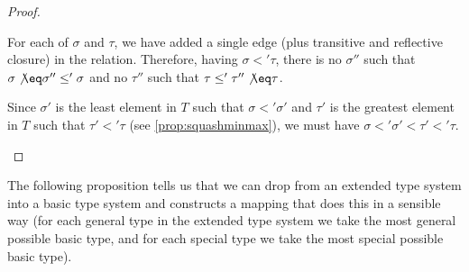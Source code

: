 \documentclass[main.tex]{subfiles}
\begin{document}
\begin{proof}
\begin{itemize}
\begin{itemize}
                    For each of $\sigma$ and $\tau$, we have added a single edge
                    (plus transitive and reflective closure) in the relation.
                    Therefore, having $\sigma \less' \tau$, there is no
                    $\sigma''$ such that $\sigma \not\eq \sigma'' \less' \sigma$
                    and no $\tau''$ such that $\tau \less' \tau'' \not\eq \tau$.

                    Since $\sigma'$ is the least element in $T$ such that
                    $\sigma \less' \sigma'$  and $\tau'$
                    is the greatest element in $T$
                    such that $\tau' \less' \tau$ (see \cref{prop:squashminmax}),
                    we must have
                    $\sigma \less' \sigma' \less \tau' \less' \tau$.
            \end{itemize}
    \end{itemize}
\end{proof}

The following proposition tells us that we can drop from an extended type
system into a basic type system and constructs a mapping that does this in a
sensible way (for each general type in the extended type system we take the
most general possible basic type, and for each special type we take the most
special possible basic type).
\end{document}
